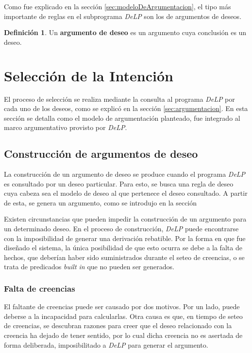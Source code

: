 \documentclass[oneside]{book}
\theoremstyle{definition}
\newtheorem{definicion}{Definición}[section]
\theoremstyle{example}
\begin{document}
Como fue explicado en la sección \ref{sec:modeloDeArgumentacion}, el tipo más importante de 
reglas en el subprograma \textit{DeLP} son los de argumentos de deseos. 

\begin{definicion}
	Un \textbf{argumento de deseo} es un argumento cuya conclusión
	es un deseo.
\end{definicion}


\section{Selección de la Intención}

El proceso de selección se realiza mediante la consulta al programa \textit{DeLP} por cada
uno de los deseos, como se explicó en la sección \ref{sec:argumentacion}. 
En esta sección se detalla como el modelo de argumentación planteado, fue integrado al marco
argumentativo provisto por \textit{DeLP}.

\subsection{Construcción de argumentos de deseo}

La construcción de un argumento de deseo se produce cuando el programa \textit{DeLP} es 
consultado por un deseo particular. Para esto, se busca una regla de deseo cuya cabeza sea
el modelo de deseo al que pertenece el deseo consultado. A partir de esta, se genera un 
argumento, como se introdujo en la sección %

Existen circunstancias que pueden impedir la construcción de un argumento para un determinado
deseo. En el proceso de construcción, \textit{DeLP} puede encontrarse con la imposibilidad de generar
una derivación rebatible. Por la forma en que fue diseñado el sistema, la única posibilidad de
que esto ocurra se debe a la falta de hechos, que deberían haber sido suministrados durante el
seteo de creencias, o se trata de predicados \textit{built in} que no pueden ser generados. 

\subsubsection{Falta de creencias}

El faltante de creencias puede ser causado por dos motivos. Por un lado, puede 
deberse a la incapacidad para calcularlas. Otra causa es que, en tiempo de seteo de creencias,
se descubran razones para creer que el deseo relacionado con la creencia ha dejado de tener 
sentido, por lo cual dicha creencia no es asertada de forma deliberada, imposibilitado a \textit{DeLP}
para generar el argumento.
\end{document}
